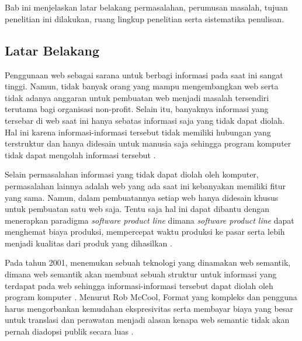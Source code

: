 \chapter{\babSatu}

Bab ini menjelaskan latar belakang permasalahan, perumusan masalah, tujuan penelitian ini dilakukan, ruang lingkup penelitian serta sistematika penulisan.

\section{Latar Belakang}

Penggunaan web sebagai sarana untuk berbagi informasi pada saat ini sangat tinggi. Namun, tidak banyak orang yang mampu mengembangkan web serta tidak adanya anggaran untuk pembuatan web menjadi masalah tersendiri terutama bagi organisasi non-profit. Selain itu, banyaknya informasi yang tersebar di web saat ini hanya sebatas informasi saja yang tidak dapat diolah. Hal ini karena informasi-informasi tersebut tidak memiliki hubungan yang terstruktur dan hanya didesain untuk manusia saja sehingga program komputer tidak dapat mengolah informasi tersebut \citep{berners.semantic}.

Selain permasalahan informasi yang tidak dapat diolah oleh komputer, permasalahan lainnya adalah web yang ada saat ini kebanyakan memiliki fitur yang sama. Namun, dalam pembuatannya setiap web hanya didesain khusus untuk pembuatan satu web saja. Tentu saja hal ini dapat dibantu dengan menerapkan paradigma \textit{software product line} dimana \textit{software product line} dapat menghemat biaya produksi, mempercepat waktu produksi ke pasar serta lebih menjadi kualitas dari produk yang dihasilkan \citep{book.sple}.

Pada tahun 2001, \cite{berners.semantic} menemukan sebuah teknologi yang dinamakan web semantik, dimana web semantik akan membuat sebuah struktur untuk informasi yang terdapat pada web sehingga informasi-informasi tersebut dapat diolah oleh program komputer \citep{berners.semantic}. Menurut Rob McCool, Format yang kompleks dan pengguna harus mengorbankan kemudahan ekspresivitas serta membayar biaya yang besar untuk translasi dan perawatan menjadi alasan kenapa web semantic tidak akan pernah diadopsi publik secara luas \citep{pragmatic.web}.

